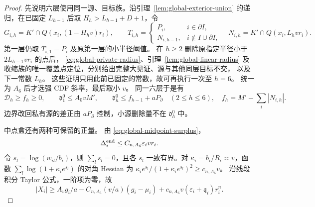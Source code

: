 \begin{proof}
先说明六层使用同一源、目标族。沿引理~\ref{lem:global-exterior-union}
的递归，在已固定 \(L_{h-1}\) 后取
\(H_h>L_{h-1}+D+1\)，令
\[
 G_{i,h}=K'\cap Q(x_i,(1-H_hv)r_i),\qquad
 T_{i,h}=
 \begin{cases}
 P_i,&i\in\partial I,\\
 N_{i,h-1},&i\notin I\cup\partial I,
 \end{cases}
 \quad
 N_{i,h}=K'\cap Q(x_i,L_hvr_i).
\]
第一层仍取 \(T_{i,1}=P_i\) 及原第一层的小半径阈值。
在 \(h\ge2\) 删除原指定半径小于 \(2L_{h-1}vr_i\) 的点后，
\eqref{eq:global-private-radius}、引理~\ref{lem:global-linear-radius}
及收缩族的唯一覆盖点定位，分别给出完整大见证、源与其他同层目标不交，
以及下一常数 \(L_h\)。
这些证明只用此前已固定的常数，故可再执行一次至 \(h=6\)。
统一为 \(A_6\) 后才选强 CDF 斜率，最后取小 \(v\)。
同一六层于是有
\begin{equation}\label{sharp-depth-relations}
 \mathcal D_h\ge f_h\ge0,\qquad
 \mathfrak d_1^0\le A_0vM',\qquad
 \mathfrak d_h^0\le f_{h-1}+aP_\partial\quad(2\le h\le6),
 \quad f_h=M'-\sum_i|N_{i,h}|.
\end{equation}
边界改回私有源的差正由 \(aP_\partial\) 控制，小源删除量不在
\(\mathfrak d_h^0\) 中。

中点盒还有两种可保留的正量。
由 \eqref{eq:global-midpoint-surplus}，
\begin{equation}\label{sharp-end-displacement}
 \Delta_i^{\rm end}\le C_{n,A_6}\varepsilon_i vr_i.
\end{equation}
令 \(s_l=\log(w_{il}/b_i)\)，则 \(\sum_l s_l=0\)，且各 \(s_l\)
一致有界。对 \(\kappa_i=b_i/R_i\asymp v\)，函数
\(\sum_l\log(1+\kappa_i e^{s_l})\) 的对角 Hessian 为
\(\kappa_i e^{s_l}/(1+\kappa_i e^{s_l})^2\ge c_{n,A_6}v\)。
沿线段积分 Taylor 公式，一阶项为零，故
\begin{equation}\label{sharp-shape-surplus}
 |X_i|\ge A_vg_i/a-C_{n,A_6}(v/a)(g_i-\mu_i)
       +c_{n,A_6}v(\varepsilon_i+\mathfrak q_i)r_i^n.
\end{equation}


\end{proof}
